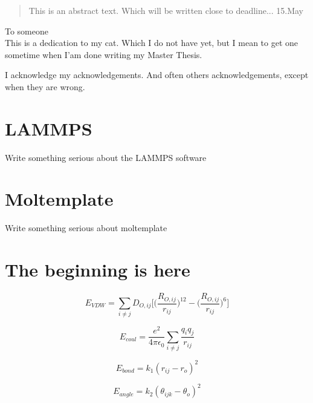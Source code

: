 \documentclass[twoside,english]{uiofysmaster}
\begin{document}

\cleardoublepage
\begin{abstract}
This is an abstract text. Which will be written close to deadline... 15.May
\end{abstract}

\begin{dedication}
  To someone
  \\\vspace{12pt}
  This is a dedication to my cat. Which I do not have yet, but I mean to get one sometime when I'am done writing my Master Thesis.
\end{dedication}

\begin{acknowledgements}
  I acknowledge my acknowledgements. And often others acknowledgements, except when they are wrong.
\end{acknowledgements}

\tableofcontents

\chapter{LAMMPS}
Write something serious about the LAMMPS software

\chapter{Moltemplate}
Write something serious about moltemplate

\chapter{The beginning is here}


\begin{equation}
E_{VDW} = \sum _{i\neq j} D_{O,ij}\Big[ \Big( \frac{R_{O,ij}}{r_{ij}} \Big) ^{12} - \Big( \frac{R_{O,ij}}{r_{ij}} \Big) ^{6} \Big]
\end{equation}

\begin{equation}
E_{coul} = \frac{e^2}{4\pi \epsilon _0}\sum _{i\neq j} \frac{q_i q_j}{r_{ij}}
\end{equation}

\begin{equation}
E_{bond} = k_1(r_{ij}-r_o)^2
\end{equation}

\begin{equation}
E_{angle} = k_2(\theta _{ijk} - \theta _o)^2
\end{equation}
\end{document}
